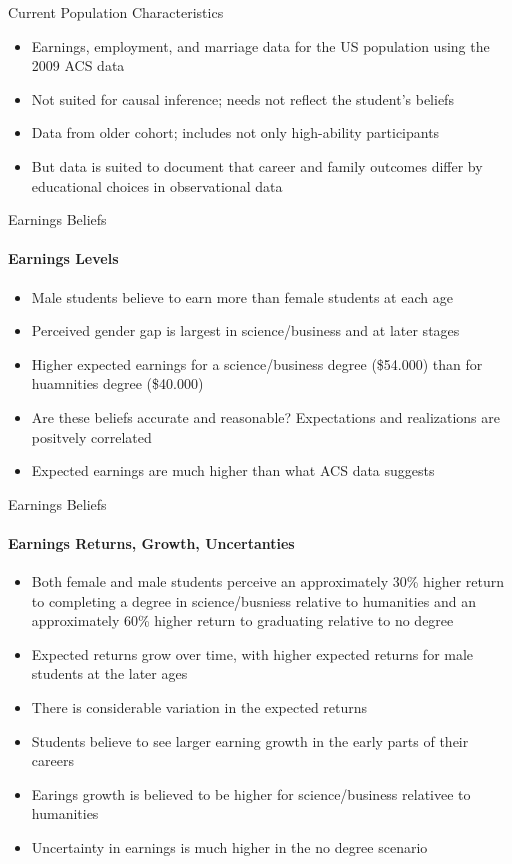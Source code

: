 \documentclass[12pt]{beamer}
\begin{document}
\begin{frame}{Current Population Characteristics}
    \begin{itemize}
        \item Earnings, employment, and marriage data for the US population using the 2009 ACS data
        \item Not suited for causal inference; needs not reflect the student's beliefs
        \item Data from older cohort; includes not only high-ability participants
        \item But data is suited to document that career and family outcomes differ by educational choices in observational data
    \end{itemize}
\end{frame}

\begin{frame}{Earnings Beliefs}
    \framesubtitle{Earnings Levels} 
    \begin{itemize}
        \item Male students believe to earn more than female students at each age
        \item Perceived gender gap is largest in science/business and at later stages
        \item Higher expected earnings for a science/business degree (\$54.000) than for huamnities degree (\$40.000)
        \item Are these beliefs accurate and reasonable? Expectations and realizations are positvely correlated
        \item Expected earnings are much higher than what ACS data suggests
    \end{itemize}
\end{frame}

\begin{frame}{Earnings Beliefs}
    \framesubtitle{Earnings Returns, Growth, Uncertanties} 
    \begin{itemize}
        \item Both female and male students perceive an approximately 30\% higher return to completing a degree in science/busniess relative to humanities and an approximately 60\% higher return to graduating relative to no degree
        \item Expected returns grow over time, with higher expected returns for male students at the later ages
        \item There is considerable variation in the expected returns 
        \item Students believe to see larger earning growth in the early parts of their careers
        \item Earings growth is believed to be higher for science/business relativee to humanities
        \item Uncertainty in earnings is much higher in the no degree scenario
    \end{itemize}
\end{frame}
\end{document}

